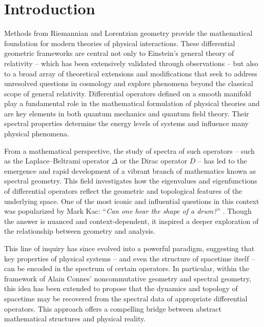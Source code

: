 \documentclass[pdftex]{sigma}
\numberwithin{equation}{section}
\theoremstyle{definition}
\begin{document}


\renewcommand{\thefootnote}{\arabic{footnote}}
\setcounter{footnote}{0}

\section{Introduction}

Methods from Riemannian and Lorentzian geometry provide the mathematical foundation for modern theories of physical interactions. These differential geometric frameworks are central not only to Einstein's general theory of relativity -- which has been extensively validated through observations -- but also to a broad array of theoretical extensions and modifications that seek to address unresolved questions in cosmology and explore phenomena beyond the classical scope of general relativity. Differential operators defined on a smooth manifold play a fundamental role in the mathematical formulation of physical theories and are key elements in both quantum mechanics and quantum field theory. Their spectral properties determine the energy levels of systems and influence many physical phenomena.

From a mathematical perspective, the study of spectra of such operators -- such as the Laplace--Beltrami operator $\Delta$ or the Dirac operator $D$ -- has led to the emergence and rapid development of a vibrant branch of mathematics known as spectral geometry. This field investigates how the eigenvalues and eigenfunctions of differential operators reflect the geometric and topological features of the underlying space. One of the most iconic and influential questions in this context was popularized by Mark Kac: ``{\it Can one hear the shape of a drum?}'' \cite{Kac}. Though the answer is nuanced and context-dependent, it inspired a deeper exploration of the relationship between geometry and analysis.

This line of inquiry has since evolved into a powerful paradigm, suggesting that key properties of physical systems -- and even the structure of spacetime itself -- can be encoded in the spectrum of certain operators. In particular, within the framework of Alain Connes' noncommutative geometry \cite{Chamseddine:1996rw,Connes_book} and spectral geometry, this idea has been extended to propose that the dynamics and topology of spacetime may be recovered from the spectral data of appropriate differential operators. This approach offers a compelling bridge between abstract mathematical structures and physical reality.
\end{document}

